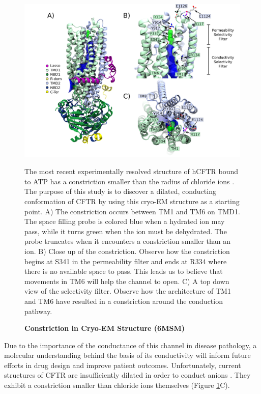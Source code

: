 \begin{figure}
	\begin{center}
		\includegraphics[width=1\textwidth]{figures/opening/overall_hole_constricted.pdf}
	\end{center}
	\captionsetup{singlelinecheck = false, justification=raggedright}
	\caption[Constriction in Cryo-EM Structure (6MSM)] {\textbf{Constriction in Cryo-EM Structure (6MSM)}}{The most recent experimentally resolved structure of hCFTR bound to ATP has a constriction smaller than the radius of chloride ions \cite{zhang2018}. The purpose of this study is to discover a dilated, conducting conformation of CFTR by using this cryo-EM structure as a starting point. A) The constriction occurs between TM1 and TM6 on TMD1. The space filling probe is colored blue when a hydrated ion may pass, while it turns green when the ion must be dehydrated. The probe truncates when it encounters a constriction smaller than an ion.  B) Close up of the constriction. Observe how the constriction begins at S341 in the permeability filter and ends at R334 where there is no available space to pass. This leads us to believe that movements in TM6 will help the channel to open. C) A top down view of the selectivity filter. Observe how the architecture of TM1 and TM6 have resulted in a constriction around the conduction pathway.}
	\label{constricted_sel_filter}
\end{figure}

Due to the importance of the conductance of this channel in disease pathology, a molecular understanding behind the basis of its conductivity will inform future efforts in drug design and improve patient outcomes. Unfortunately, current structures of CFTR are insufficiently dilated in order to conduct anions \cite{zhang2018, liu2019, fiedorczuk2022}. They exhibit a constriction smaller than chloride ions themselves (Figure \ref{constricted_sel_filter}C).

